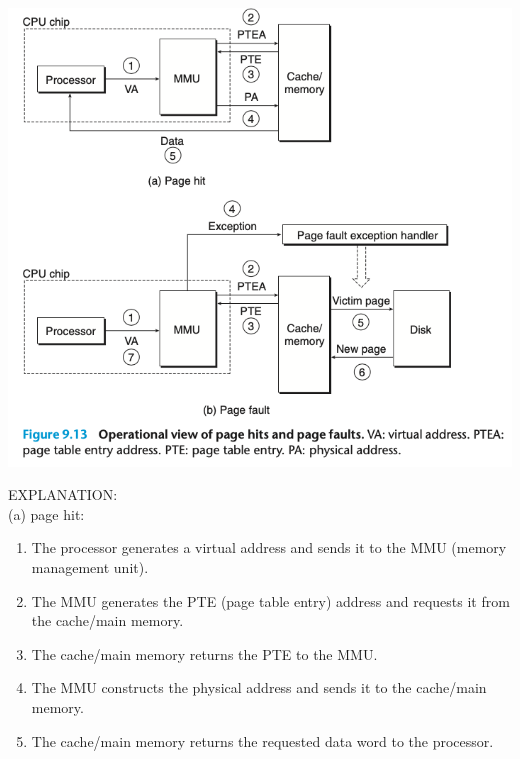 \documentclass[11pt]{article}
\begin{document}
\begin{center}
\includegraphics[width=.9\linewidth]{pics/figure9.13-page-hit-and-page-fault.png}
\end{center}

EXPLANATION:\\
(a) page hit:\\
\begin{enumerate}
\item The processor generates a virtual address and sends it to the MMU (memory management unit).\\
\item The MMU generates the PTE (page table entry) address and requests it from the cache/main memory.\\
\item The cache/main memory returns the PTE to the MMU.\\
\item The MMU constructs the physical address and sends it to the cache/main memory.\\
\item The cache/main memory returns the requested data word to the processor.\\
\end{enumerate}
\end{document}
